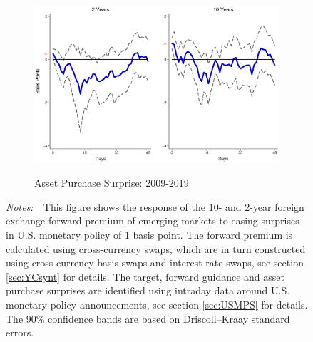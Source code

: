 \documentclass[a4paper, 12pt]{article}
\newcommand{\figtext}[1]{
	\vspace{-1ex}
	\captionsetup{justification=justified,font=footnotesize}
	\caption*{#1}
}
\newcommand{\fignotes}[1]{\figtext{\emph{Notes:~}~#1}}
\begin{document}
\begin{appendices}
\begin{figure}[tbph]
\begin{center}
\begin{minipage}{\linewidth}
\begin{center}
					\begin{subfigure}[t]{\linewidth}
						\includegraphics[trim={0cm 0cm 0cm 0cm},clip,height=0.235\textheight,width=\linewidth]{../Figures/LSAPEMrho.eps} \\
						\vspace{-0.35cm}
						\caption{Asset Purchase Surprise: 2009-2019} \label{subfig:LPEMRHOlsap}
					\end{subfigure}
				\end{center}
				\fignotes{This figure shows the response of the 10- and 2-year foreign exchange forward premium of emerging markets to easing surprises in U.S. monetary policy of 1 basis point. The forward premium is calculated using cross-currency swaps, which are in turn constructed using cross-currency basis swaps and interest rate swaps, see section \ref{sec:YCsynt} for details. The target, forward guidance and asset purchase surprises are identified using intraday data around U.S. monetary policy announcements, see section \ref{sec:USMPS} for details. The 90\% confidence bands are based on Driscoll--Kraay standard errors.}
			\end{minipage}
		\end{center}
	\end{figure}
	
	
	\begin{landscape}
		\newpage
	\end{landscape}
	
\end{appendices}

\newpage
	
\end{document}
